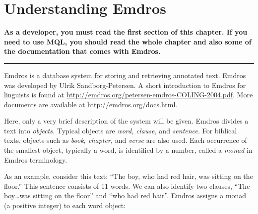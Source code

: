 \documentclass[11pt,oneside,a4paper]{memoir}
\begin{document}
\chapter{Understanding Emdros}\label{chap-emdros-use}

\textbf{As a developer, you must read the first section of this chapter. If you need to use MQL, you
  should read the whole chapter and also some of the documentation that comes with Emdros.}

\plainbreak{3}

Emdros is a database system for storing and retrieving annotated text. Emdros was developed by Ulrik
Sandborg-Petersen. A short introduction to Emdros for linguists is found at
\url{http://emdros.org/petersen-emdros-COLING-2004.pdf}. More documents are available at
\url{http://emdros.org/docs.html}.

Here, only a very brief description of the system will be given. Emdros divides a text into
\emph{objects.} Typical objects are \emph{word, clause,} and \emph{sentence.} For biblical texts,
objects such as \emph{book, chapter,} and \emph{verse} are also used. Each occurrence of the
smallest object, typically a word, is identified by a number, called a \emph{monad} in Emdros terminology.

As an example, consider this text: ``The boy, who had red hair, was sitting on the floor.'' This
sentence consists of 11 words. We can also identify two clauses, ``The boy\ldots was sitting on the
floor'' and ``who had red hair''. Emdros assigns a monad (a positive integer) to each word object:
\end{document}
